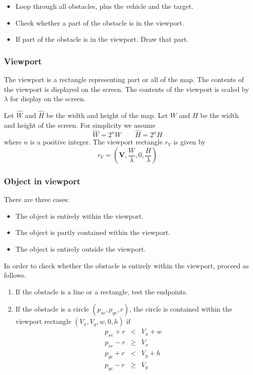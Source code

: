 \documentclass[11pt]{article}
\newcommand{\Hhat}{\widehat{H}}
\newcommand{\pxc}{p_{xc}}
\newcommand{\pyc}{p_{yc}}
\newcommand{\Vb}{\mathbf{V}}
\newcommand{\What}{\widehat{W}}
\begin{document}
\begin{itemize}
    \item Loop through all obstacles, plus the vehicle and the target.
    \item Check whether a part of the obstacle is in the viewport.
    \item If part of the obstacle is in the viewport. Draw that part.
\end{itemize}

\subsubsection{Viewport}
\label{sec-map-implementation-viewport}

The viewport is a rectangle representing part or all of the map. The contents
of the viewport is displayed on the screen. The contents of the viewport is
scaled by $\lambda$ for display on the screen.

Let $\What$ and $\Hhat$ be the width and height of the map. Let $W$ and $H$
be the width and height of the screen. For simplicity we assume
\begin{equation}
    \What = 2^n W \qquad \Hhat = 2^n H\label{eq-map-coordinates}
\end{equation}
where $n$ is a positive integer. The viewport rectangle $r_{V}$
is given by
\begin{equation}
    r_{V}=\left(\Vb, \frac{W}{\lambda}, 0, \frac{H}{\lambda}\right)
\end{equation}

\subsubsection{Object in viewport}
\label{sec-map-implementation-obstacle-in-viewport}


There are three cases:
\begin{itemize}
    \item The object is entirely within the viewport.
    \item The object is partly contained within the viewport.
    \item The object is entirely outside the viewport.
\end{itemize}

In order to check whether the obstacle is entirely within the viewport, proceed
as follows.
\begin{enumerate}
    \item If the obstacle is a line or a rectangle, test the endpoints.
    \item If the obstacle is a circle $(\pxc,\pyc,r)$, the circle is
        contained within the viewport rectangle $(V_{x}, V_{y}, w, 0, h)$
        if
        \begin{eqnarray*}
            \pxc + r &<& V_{x} + w\\
            \pxc - r &\geq& V_{x}\\
            \pyc + r &<& V_{y} + h\\
            \pyc - r &\geq& V_{y}
        \end{eqnarray*}
\end{enumerate}
\end{document}
